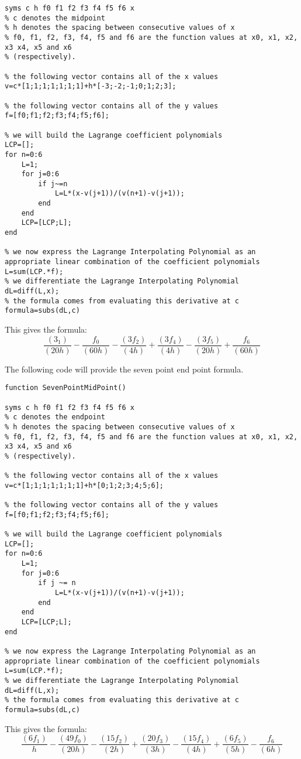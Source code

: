 \documentclass[12 pt, letterpaper]{exam}
\theoremstyle{definition}
\begin{document}
\begin{questions}
\begin{solution}
\begin{lstlisting}
syms c h f0 f1 f2 f3 f4 f5 f6 x
% c denotes the midpoint
% h denotes the spacing between consecutive values of x
% f0, f1, f2, f3, f4, f5 and f6 are the function values at x0, x1, x2, x3 x4, x5 and x6
% (respectively).

% the following vector contains all of the x values
v=c*[1;1;1;1;1;1;1]+h*[-3;-2;-1;0;1;2;3];

% the following vector contains all of the y values
f=[f0;f1;f2;f3;f4;f5;f6];

% we will build the Lagrange coefficient polynomials
LCP=[];
for n=0:6
    L=1;
    for j=0:6
        if j~=n
            L=L*(x-v(j+1))/(v(n+1)-v(j+1));
        end
    end
    LCP=[LCP;L];
end

% we now express the Lagrange Interpolating Polynomial as an appropriate linear combination of the coefficient polynomials
L=sum(LCP.*f);
% we differentiate the Lagrange Interpolating Polynomial
dL=diff(L,x);
% the formula comes from evaluating this derivative at c
formula=subs(dL,c)
\end{lstlisting}
This gives the formula: 
$$ \frac{(3_1)}{(20h)} - \frac{f_0}{(60h)} - \frac{(3f_2)}{(4h)} + \frac{(3f_4)}{(4h)} - \frac{(3f_5)}{(20h)} + \frac{f_6}{(60h)} $$

The following code will provide the seven point end point formula.
\begin{lstlisting}
function SevenPointMidPoint()

syms c h f0 f1 f2 f3 f4 f5 f6 x
% c denotes the endpoint
% h denotes the spacing between consecutive values of x
% f0, f1, f2, f3, f4, f5 and f6 are the function values at x0, x1, x2, x3 x4, x5 and x6
% (respectively).

% the following vector contains all of the x values
v=c*[1;1;1;1;1;1;1]+h*[0;1;2;3;4;5;6];

% the following vector contains all of the y values
f=[f0;f1;f2;f3;f4;f5;f6];

% we will build the Lagrange coefficient polynomials
LCP=[];
for n=0:6
    L=1;
    for j=0:6
        if j ~= n
            L=L*(x-v(j+1))/(v(n+1)-v(j+1));
        end
    end
    LCP=[LCP;L];
end

% we now express the Lagrange Interpolating Polynomial as an appropriate linear combination of the coefficient polynomials
L=sum(LCP.*f);
% we differentiate the Lagrange Interpolating Polynomial
dL=diff(L,x);
% the formula comes from evaluating this derivative at c
formula=subs(dL,c)    
\end{lstlisting}
This gives the formula:
$$ \frac{(6f_1)}{h} - \frac{(49f_0)}{(20h)} - \frac{(15f_2)}{(2h)} + \frac{(20f_3)}{(3h)} - \frac{(15f_4)}{(4h)} + \frac{(6f_5)}{(5h)} - \frac{f_6}{(6h)} $$
\end{solution}


\end{questions}
\end{document}

